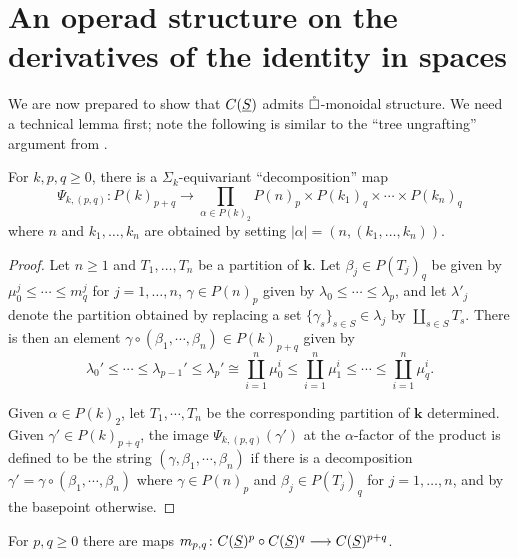\section{An operad structure on the derivatives of the identity in spaces}

We are now prepared to show that $C(\underline{S})$ admits $\mathring{\square}$-monoidal structure. We need a technical lemma first; note the following is similar to the ``tree ungrafting'' argument from \cite{Ching-thesis}. 

\begin{lemma} \label{lem:tech}
    For $k,p,q\geq 0$, there is a $\Sigma_k$-equivariant ``decomposition'' map \[\Psi_{k,(p,q)} \colon P(k)_{p+q}\to \prod_{\alpha\in P(k)_2 } P(n)_p\times  P(k_1)_q\times \cdots \times  P(k_n)_q\]
    where $n$ and $k_1,\dots,k_n$ are obtained by setting $| \alpha |=(n,(k_1,\dots,k_n))$.
\end{lemma}


\begin{proof}
    Let $n\geq 1$ and $T_1,\dots,T_n$ be a partition of $\mathbf{k}$. Let $\beta_j\in P(T_j)_q$ be given by $\mu_0^j\leq \cdots \leq m^j_q$ for $j=1,\dots,n$, $\gamma\in P(n)_p$ given by $\lambda_0 \leq \cdots \leq \lambda_p$, and let $\lambda'_j$ denote the partition obtained by replacing a set $\{\gamma_s\}_{s\in S}\in \lambda_j$ by $\coprod_{s\in S} T_s$. There is then an element $\gamma\circ (\beta_1,\cdots,\beta_n) \in P(k)_{p+q}$ given by \[ \lambda_0'\leq \cdots \leq \lambda_{p-1}' \leq \lambda_p' \cong \coprod_{i=1}^{n} \mu^i_0 \leq \coprod_{i=1}^n \mu^i_1 \leq \cdots \leq \coprod_{i=1}^n \mu^i_q.\]
    
    Given $\alpha\in P(k)_2$, let $T_1,\cdots,T_n$ be the corresponding partition of $\mathbf{k}$ determined. Given $\gamma'\in P(k)_{p+q}$, the image $\Psi_{k,(p,q)}(\gamma')$ at the $\alpha$-factor of the product is defined to be the string $(\gamma,\beta_1,\cdots,\beta_n)$ if there is a decomposition $\gamma'=\gamma\circ (\beta_1,\cdots,\beta_n)$ where $\gamma\in P(n)_p$ and $\beta_j\in P(T_j)_q$ for $j=1,\dots,n$, and by the basepoint otherwise. 
\end{proof}

\begin{proposition} \label{prop:m_p,q}
    For $p,q\geq 0$ there are maps $m_{p,q} \colon C(\underline{S})^p \circ C(\underline{S})^q \longrightarrow C(\underline{S})^{p+q}$.
\end{proposition}

